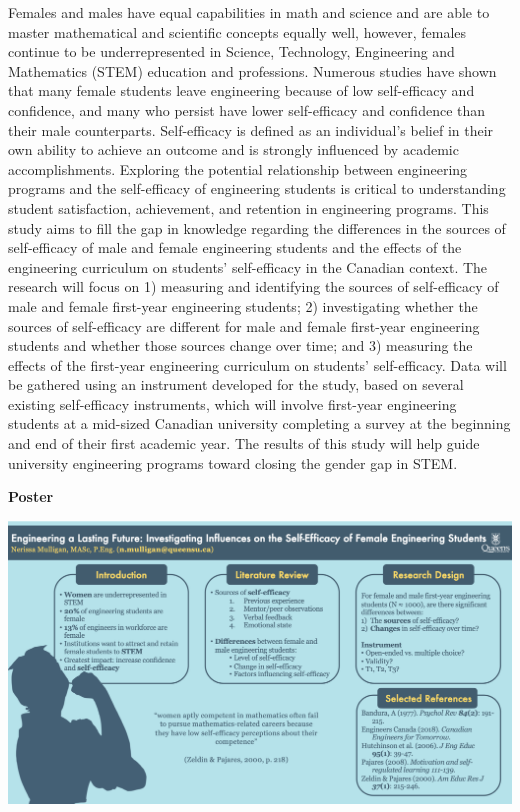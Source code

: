 \documentclass[
]{book}
\begin{document}
Females and males have equal capabilities in math and science and are able to master mathematical and scientific concepts equally well, however, females continue to be underrepresented in Science, Technology, Engineering and Mathematics (STEM) education and professions. Numerous studies have shown that many female students leave engineering because of low self-efficacy and confidence, and many who persist have lower self-efficacy and confidence than their male counterparts. Self-efficacy is defined as an individual's belief in their own ability to achieve an outcome and is strongly influenced by academic accomplishments. Exploring the potential relationship between engineering programs and the self-efficacy of engineering students is critical to understanding student satisfaction, achievement, and retention in engineering programs. This study aims to fill the gap in knowledge regarding the differences in the sources of self-efficacy of male and female engineering students and the effects of the engineering curriculum on students' self-efficacy in the Canadian context. The research will focus on 1) measuring and identifying the sources of self-efficacy of male and female first-year engineering students; 2) investigating whether the sources of self-efficacy are different for male and female first-year engineering students and whether those sources change over time; and 3) measuring the effects of the first-year engineering curriculum on students' self-efficacy. Data will be gathered using an instrument developed for the study, based on several existing self-efficacy instruments, which will involve first-year engineering students at a mid-sized Canadian university completing a survey at the beginning and end of their first academic year. The results of this study will help guide university engineering programs toward closing the gender gap in STEM.

\textbf{Poster}

\includegraphics{Content/NM.png}
\end{document}

